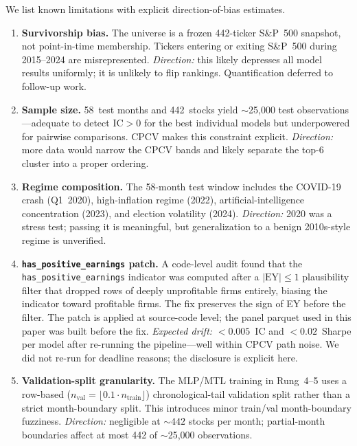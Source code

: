 \documentclass[11pt]{article}
\begin{document}
We list known limitations with explicit direction-of-bias estimates.

\begin{enumerate}[leftmargin=2em,topsep=2pt,itemsep=4pt]

\item \textbf{Survivorship bias.} The universe is a frozen 442-ticker
  S\&P~500 snapshot, not point-in-time membership. Tickers entering or
  exiting S\&P~500 during 2015--2024 are misrepresented. \emph{Direction:}
  this likely depresses all model results uniformly; it is unlikely to
  flip rankings. Quantification deferred to follow-up work.

\item \textbf{Sample size.} 58~test months and 442~stocks yield
  $\sim$25{,}000 test observations---adequate to detect IC$>0$ for the
  best individual models but underpowered for pairwise comparisons.
  CPCV makes this constraint explicit. \emph{Direction:} more data would
  narrow the CPCV bands and likely separate the top-6 cluster into a
  proper ordering.

\item \textbf{Regime composition.} The 58-month test window includes
  the COVID-19 crash (Q1~2020), high-inflation regime (2022),
  artificial-intelligence concentration (2023), and election volatility
  (2024). \emph{Direction:} 2020 was a stress test; passing it is
  meaningful, but generalization to a benign 2010s-style regime is
  unverified.

\item \textbf{\texttt{has\_positive\_earnings} patch.} A code-level
  audit found that the \texttt{has\_positive\_earnings} indicator was
  computed after a $|\text{EY}|\le 1$ plausibility filter that dropped
  rows of deeply unprofitable firms entirely, biasing the indicator
  toward profitable firms. The fix preserves the sign of EY before the
  filter. The patch is applied at source-code level; the panel
  parquet used in this paper was built before the fix. \emph{Expected
  drift:} $<0.005$~IC and $<0.02$~Sharpe per model after re-running
  the pipeline---well within CPCV path noise. We did not re-run for
  deadline reasons; the disclosure is explicit here.

\item \textbf{Validation-split granularity.} The MLP/MTL training in
  Rung~4--5 uses a row-based ($n_\text{val}=\lfloor 0.1\cdot
  n_\text{train}\rfloor$) chronological-tail validation split rather
  than a strict month-boundary split. This introduces minor
  train/val month-boundary fuzziness. \emph{Direction:} negligible at
  ${\sim}442$ stocks per month; partial-month boundaries affect at
  most 442 of $\sim$25{,}000 observations.


\end{enumerate}
\end{document}
